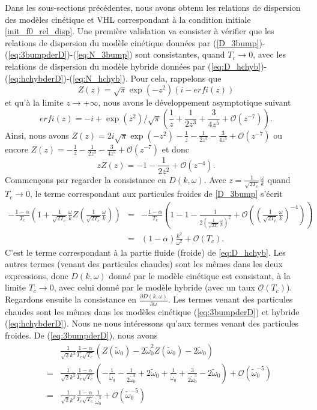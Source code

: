 Dans les sous-sections précédentes, nous avons obtenu les relations de dispersion des modèles cinétique et VHL correspondant à la condition initiale \eqref{init_f0_rel_disp}. Une première validation va consister à vérifier que les relations de dispersion du modèle cinétique données par (\ref{D_3bump})-(\ref{eq:3bumpderD})-(\ref{eq:N_3bump}) sont consistantes, quand $T_c\to 0$, avec les relations de dispersion du modèle hybride données par (\ref{eq:D_hchyb})-(\ref{eq:hchybderD})-(\ref{eq:N_hchyb}). Pour cela, rappelons que 
$$
  Z(z)=\sqrt{\pi} \exp(-z^2) (i - erfi(z) )
$$
et qu'à la limite $z\to+\infty$, nous avons le développement asymptotique suivant 
$$
  erfi(z) = -i + \exp(z^2)/\sqrt{\pi} (\frac{1}{z} +\frac{1}{2z^3} +\frac{3}{4z^5} + \mathcal{O}\left(z^{-7}\right) ).
$$
Ainsi, nous avons $Z(z) =  2 i \sqrt{\pi} \exp(-z^2)  - \frac{1}{z}  - \frac{1}{2z^3} - \frac{3}{4z^5}+ \mathcal{O}\left(z^{-7}\right)$ ou encore $Z(z)= - \frac{1}{z}  - \frac{1}{2z^3}- \frac{3}{4z^5}+ \mathcal{O}\left(z^{-7}\right)$ et donc
$$
  zZ(z)=-1-\frac{1}{2z^2} + \mathcal{O}\left(z^{-4}\right).
$$
Commençons par regarder la consistance en $D(k,\omega)$. Avec $z=\frac{1}{\sqrt{2T_c}}\frac{\omega}{k}$ quand $T_c\to 0$, le terme correspondant aux particules froides de \eqref{D_3bump} s'écrit
\begin{eqnarray*}
  -\frac{1-\alpha}{T_c}\left(1+\frac{1}{\sqrt{2T_c}}\frac{\omega}{k}Z\left(\frac{1}{\sqrt{2T_c}}\frac{\omega}{k}\right)\right)&=&-\frac{1-\alpha}{T_c}\left(1-1-\frac{1}{2\left(\frac{1}{\sqrt{2T_c}}\frac{\omega}{k}\right)^2}+ \mathcal{O}\left(\left(\frac{1}{\sqrt{2T_c}}\frac{\omega}{k}\right)^{-4}\right)\right)\nonumber\\
  &=& \left(1-\alpha\right)\frac{k^2}{\omega^2} + \mathcal{O}(T_c). 
\end{eqnarray*}
C'est le terme correspondant à la partie fluide (froide) de \eqref{eq:D_hchyb}. Les autres termes (venant des particules chaudes) sont les mêmes dans les deux expressions, donc $D(k,\omega)$ donné par le modèle cinétique est consistant, à la limite $T_c\to 0$, avec celui donné par le modèle hybride (avec un taux $\mathcal{O}(T_c)$). Regardons ensuite la consistance en $\frac{\partial D(k,\omega)}{\partial \omega}$. Les termes venant des particules chaudes sont les mêmes dans les modèles cinétique (\ref{eq:3bumpderD}) et hybride (\ref{eq:hchybderD}). Nous ne nous intéressons qu'aux termes venant des particules froides. De (\ref{eq:3bumpderD}), nous avons
\begin{eqnarray*}
  &&\frac{1}{\sqrt{2}k^3}\frac{1-\alpha}{T_c\sqrt{T_c}}\left(Z\left(\tilde{\omega}_0\right)-2\tilde{\omega}_0^2Z\left(\tilde{\omega}_0\right)-2\tilde{\omega}_0\right)\\
  &=&\frac{1}{\sqrt{2}k^3}\frac{1-\alpha}{T_c\sqrt{T_c}}\left(-\frac{1}{\tilde{\omega}_0}-\frac{1}{2\tilde{\omega}_0^3}+2\tilde{\omega}_0+\frac{1}{\tilde{\omega}_0}+\frac{3}{2\tilde{\omega}_0^3}-2\tilde{\omega}_0\right)+\mathcal{O}\left(\tilde{\omega}_0^{-5}\right)\\
  &=&\frac{1}{\sqrt{2}k^3}\frac{1-\alpha}{T_c\sqrt{T_c}}\frac{1}{\tilde{\omega}_0^3}+\mathcal{O}\left(\tilde{\omega}_0^{-5}\right)
\end{eqnarray*}
